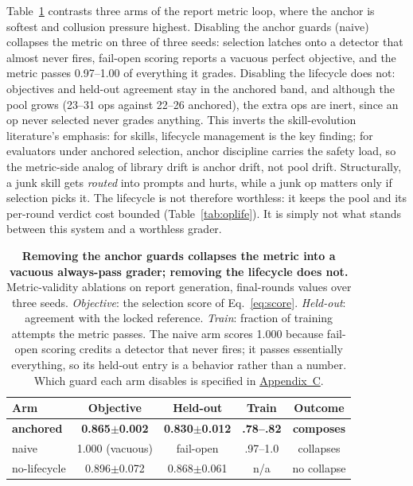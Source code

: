 \documentclass[letterpaper]{article} %
\begin{document}
Table~\ref{tab:ablation} contrasts three arms of the report metric loop, where the anchor is softest and collusion pressure highest. Disabling the anchor guards (naive) collapses the metric on three of three seeds: selection latches onto a detector that almost never fires, fail-open scoring reports a vacuous perfect objective, and the metric passes 0.97--1.00 of everything it grades. Disabling the lifecycle does not: objectives and held-out agreement stay in the anchored band, and although the pool grows (23--31 ops against 22--26 anchored), the extra ops are inert, since an op never selected never grades anything. This inverts the skill-evolution literature's emphasis: for skills, lifecycle management is the key finding; for evaluators under anchored selection, anchor discipline carries the safety load, so the metric-side analog of library drift is anchor drift, not pool drift. Structurally, a junk skill gets \emph{routed} into prompts and hurts, while a junk op matters only if selection picks it. The lifecycle is not therefore worthless: it keeps the pool and its per-round verdict cost bounded (Table~\ref{tab:oplife}). It is simply not what stands between this system and a worthless grader.

\begin{table}[t]
\centering
\footnotesize
\setlength{\tabcolsep}{2.2pt}
\begin{tabular}{lcccc}
\toprule
Arm & Objective & Held-out & Train & Outcome \\
\midrule
\textbf{anchored} & \textbf{0.865$\pm$0.002} & \textbf{0.830$\pm$0.012} & \textbf{.78--.82} & \textbf{composes} \\
naive & 1.000 (vacuous) & fail-open & .97--1.0 & collapses \\
no-lifecycle & 0.896$\pm$0.072 & 0.868$\pm$0.061 & n/a & no collapse \\
\bottomrule
\end{tabular}
\caption{\textbf{Removing the anchor guards collapses the metric into a vacuous always-pass grader; removing the lifecycle does not.} Metric-validity ablations on report generation, final-rounds values over three seeds. \emph{Objective}: the selection score of Eq.~\ref{eq:score}. \emph{Held-out}: agreement with the locked reference. \emph{Train}: fraction of training attempts the metric passes. The naive arm scores 1.000 because fail-open scoring credits a detector that never fires; it passes essentially everything, so its held-out entry is a behavior rather than a number. Which guard each arm disables is specified in \hyperref[app:lang]{Appendix~C}.}
\label{tab:ablation}
\end{table}
\end{document}
